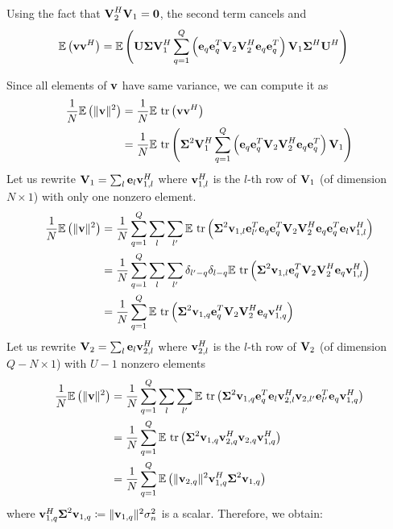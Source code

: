 \documentclass[12pt]{article}
\begin{document}
Using the fact that $\boldsymbol{\mathrm{V}}_2^H \boldsymbol{\mathrm{V}}_1=\boldsymbol{\mathrm{0}}$, the second term cancels and
\begin{align}
\mathbb{E}\left(\boldsymbol{\mathrm{v}}\boldsymbol{\mathrm{v}}^H\right)&=\mathbb{E}\left(\boldsymbol{\mathrm{U}} \boldsymbol{\mathrm{\Sigma}}\boldsymbol{\mathrm{V}}_1^H  \sum_{q=1}^Q\left(\boldsymbol{\mathrm{e}}_q \boldsymbol{\mathrm{e}}_q^T \boldsymbol{\mathrm{V}}_2 \boldsymbol{\mathrm{V}}_2^H \boldsymbol{\mathrm{e}}_{q} \boldsymbol{\mathrm{e}}_{q}^T\right)\boldsymbol{\mathrm{V}}_1 \boldsymbol{\mathrm{\Sigma}}^H   \boldsymbol{\mathrm{U}}^H\right)
\end{align}

Since all elements of $\boldsymbol{\mathrm{v}}$ have same variance, we can compute it as
\begin{align}
\frac{1}{N}\mathbb{E}\left(\|\vect{v}\|^2\right)&=\frac{1}{N}\mathbb{E}\ \tr\left(\vect{v}\vect{v}^H\right)\\
&=\frac{1}{N}\mathbb{E} \ \tr\left( \mat{\Sigma}^2\mat{V}_1^H  \sum_{q=1}^Q\left(\vect{e}_q \vect{e}_q^T \mat{V}_2 \mat{V}_2^H \vect{e}_{q} \vect{e}_{q}^T\right)\mat{V}_1 \right)
\end{align}
Let us rewrite $\boldsymbol{\mathrm{V}}_1=\sum_{l}\boldsymbol{\mathrm{e}}_{l}\boldsymbol{\mathrm{v}}_{1,l}^H$ where $\boldsymbol{\mathrm{v}}_{1,l}^H$ is the $l$-th row of $\boldsymbol{\mathrm{V}}_1$ (of dimension $N\times 1$) with only one nonzero element.
\begin{align}
\frac{1}{N}\mathbb{E}\left(\|\boldsymbol{\mathrm{v}}\|^2\right)&=\frac{1}{N}\sum_{q=1}^Q\sum_{l}\sum_{l'}\mathbb{E} \ \text{tr}\left( \boldsymbol{\mathrm{\Sigma}}^2\boldsymbol{\mathrm{v}}_{1,l}\boldsymbol{\mathrm{e}}_{l'}^T  \boldsymbol{\mathrm{e}}_q \boldsymbol{\mathrm{e}}_q^T \boldsymbol{\mathrm{V}}_2 \boldsymbol{\mathrm{V}}_2^H \boldsymbol{\mathrm{e}}_{q} \boldsymbol{\mathrm{e}}_{q}^T\boldsymbol{\mathrm{e}}_{l}\boldsymbol{\mathrm{v}}_{1,l}^H \right)\\
&=\frac{1}{N}\sum_{q=1}^Q\sum_{l}\sum_{l'}\delta_{l'-q}\delta_{l-q} \mathbb{E} \ \text{tr}\left( \boldsymbol{\mathrm{\Sigma}}^2\boldsymbol{\mathrm{v}}_{1,l}\boldsymbol{\mathrm{e}}_q^T \boldsymbol{\mathrm{V}}_2 \boldsymbol{\mathrm{V}}_2^H \boldsymbol{\mathrm{e}}_{q} \boldsymbol{\mathrm{v}}_{1,l}^H \right)\\
&=\frac{1}{N}\sum_{q=1}^Q \mathbb{E} \ \text{tr}\left( \boldsymbol{\mathrm{\Sigma}}^2\boldsymbol{\mathrm{v}}_{1,q}\boldsymbol{\mathrm{e}}_q^T \boldsymbol{\mathrm{V}}_2 \boldsymbol{\mathrm{V}}_2^H \boldsymbol{\mathrm{e}}_{q} \boldsymbol{\mathrm{v}}_{1,q}^H \right)
\end{align}
Let us rewrite $\boldsymbol{\mathrm{V}}_2=\sum_{l}\boldsymbol{\mathrm{e}}_{l}\boldsymbol{\mathrm{v}}_{2,l}^H$ where $\boldsymbol{\mathrm{v}}_{2,l}^H$ is the $l$-th row of $\boldsymbol{\mathrm{V}}_2$ (of dimension $Q-N\times 1$) with $U-1$ nonzero elements
\begin{align}
\frac{1}{N}\mathbb{E}\left(\|\boldsymbol{\mathrm{v}}\|^2\right)&=\frac{1}{N}\sum_{q=1}^Q\sum_l\sum_{l'} \mathbb{E} \ \text{tr}\left( \boldsymbol{\mathrm{\Sigma}}^2\boldsymbol{\mathrm{v}}_{1,q}\boldsymbol{\mathrm{e}}_q^T \boldsymbol{\mathrm{e}}_{l}\boldsymbol{\mathrm{v}}_{2,l}^H \boldsymbol{\mathrm{v}}_{2,l'} \boldsymbol{\mathrm{e}}_{l'}^T \boldsymbol{\mathrm{e}}_{q} \boldsymbol{\mathrm{v}}_{1,q}^H \right)\\
&=\frac{1}{N}\sum_{q=1}^Q \mathbb{E} \ \text{tr}\left( \boldsymbol{\mathrm{\Sigma}}^2\boldsymbol{\mathrm{v}}_{1,q}\boldsymbol{\mathrm{v}}_{2,q}^H \boldsymbol{\mathrm{v}}_{2,q} \boldsymbol{\mathrm{v}}_{1,q}^H \right)\\
&=\frac{1}{N}\sum_{q=1}^Q \mathbb{E} \left( \| \boldsymbol{\mathrm{v}}_{2,q}\|^2\boldsymbol{\mathrm{v}}_{1,q}^H\boldsymbol{\mathrm{\Sigma}}^2\boldsymbol{\mathrm{v}}_{1,q}  \right)
\end{align}
where $\boldsymbol{\mathrm{v}}_{1,q}^H \boldsymbol{\mathrm{\Sigma}}^2 \boldsymbol{\mathrm{v}}_{1,q} \coloneqq  \| \boldsymbol{\mathrm{v}}_{1,q}\|^2 \sigma_n^2$ is a scalar. Therefore, we obtain:
\end{document}
